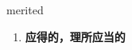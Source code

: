 
\begin{frame}
{\huge merited}
\begin{center}
\begin{enumerate}\Large
  \item \textbf{应得的，理所应当的}
\end{enumerate}
\end{center}
\end{frame}
